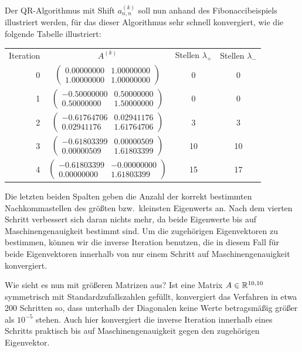 Der QR-Algorithmus mit Shift $a^{(k)}_{n,n}$ soll nun anhand des
Fibonaccibeispiels illustriert werden, für das dieser Algorithmus sehr
schnell konvergiert, wie die folgende Tabelle illustriert:
\begin{center}
  \renewcommand{\arraystretch}{1.3}
  \begin{tabular}{r|c|c|c}
    Iteration & $A^{(k)}$ & Stellen $\lambda_+$ &  Stellen $\lambda_-$\\
    0 & $\begin{pmatrix}
      0.00000000 &  1.00000000\\
      1.00000000 &  1.00000000
    \end{pmatrix}$
    & 0 & 0\\
    1 & $\begin{pmatrix}
      -0.50000000 &  0.50000000\\
      0.50000000 & 1.50000000
    \end{pmatrix}$
    & 0 & 0\\
    2 & $\begin{pmatrix}
      -0.61764706 &  0.02941176\\
      0.02941176 & 1.61764706
    \end{pmatrix}$
    & 3 & 3\\
    3 & $\begin{pmatrix}
      -0.61803399 &  0.00000509\\
      0.00000509 & 1.61803399
    \end{pmatrix}$
    & 10 & 10\\
    4 & $\begin{pmatrix}
      -0.61803399 & -0.00000000\\
      0.00000000 & 1.61803399
    \end{pmatrix}$ & 15 & 17
  \end{tabular}
\end{center}
Die letzten beiden Spalten geben die Anzahl der korrekt bestimmten
Nachkommastellen des größten bzw.\ kleinsten Eigenwerts an. Nach dem
vierten Schritt verbessert sich daran nichts mehr, da beide Eigenwerte
bis auf Maschinengenauigkeit bestimmt sind.  Um die zugehörigen
Eigenvektoren zu bestimmen, können wir die inverse Iteration benutzen,
die in diesem Fall für beide Eigenvektoren innerhalb von nur einem
Schritt auf Maschinengenauigkeit konvergiert.

Wie sieht es nun mit größeren Matrizen aus? Ist eine Matrix
$A\in\mathbb{R}^{10,10}$ symmetrisch mit Standardzufallszahlen gefüllt,
konvergiert das Verfahren in etwa 200 Schritten so, dass unterhalb der
Diagonalen keine Werte betragsmäßig größer als $10^{-5}$ stehen. Auch
hier konvergiert die inverse Iteration innerhalb eines Schritts
praktisch bis auf Maschinengenauigkeit gegen den zugehörigen
Eigenvektor.

